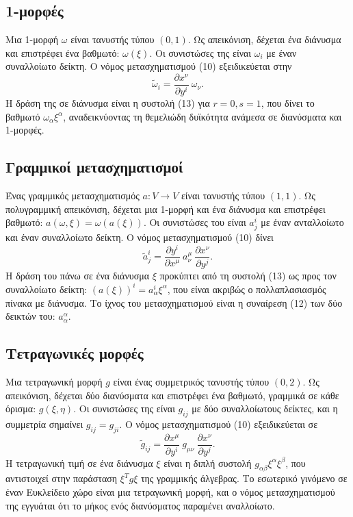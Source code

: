 \documentclass[12pt]{article}
\begin{document}
\subsection{1-μορφές}
Μια 1-μορφή \( \omega \) είναι τανυστής τύπου \( (0,1) \). Ως απεικόνιση, δέχεται ένα διάνυσμα και επιστρέφει ένα βαθμωτό: \( \omega(\xi) \). Οι συνιστώσες της είναι \( \omega_i \) με έναν συναλλοίωτο δείκτη. Ο νόμος μετασχηματισμού (10) εξειδικεύεται στην
\[
\tilde{\omega}_i = \frac{\partial x^\nu}{\partial y^i} \ \omega_\nu. \tag{15}
\]
Η δράση της σε διάνυσμα είναι η συστολή (13) για \( r=0, s=1 \), που δίνει το βαθμωτό \( \omega_\alpha \xi^\alpha \), αναδεικνύοντας τη θεμελιώδη δυϊκότητα ανάμεσα σε διανύσματα και 1-μορφές.

\subsection{Γραμμικοί μετασχηματισμοί}
Ένας γραμμικός μετασχηματισμός \( a: V \to V \) είναι τανυστής τύπου \( (1,1) \). Ως πολυγραμμική απεικόνιση, δέχεται μια 1-μορφή και ένα διάνυσμα και επιστρέφει βαθμωτό: \( a(\omega, \xi) = \omega(a(\xi)) \). Οι συνιστώσες του είναι \( a^i_j \) με έναν ανταλλοίωτο και έναν συναλλοίωτο δείκτη. Ο νόμος μετασχηματισμού (10) δίνει
\[
\tilde{a}^i_j = \frac{\partial y^i}{\partial x^\mu} \ a^\mu_\nu \ \frac{\partial x^\nu}{\partial y^j}. \tag{16}
\]
Η δράση του πάνω σε ένα διάνυσμα \( \xi \) προκύπτει από τη συστολή (13) ως προς τον συναλλοίωτο δείκτη: \( (a(\xi))^i = a^i_\alpha \xi^\alpha \), που είναι ακριβώς ο πολλαπλασιασμός πίνακα με διάνυσμα. Το ίχνος του μετασχηματισμού είναι η συναίρεση (12) των δύο δεικτών του: \( a^\alpha_\alpha \).

\subsection{Τετραγωνικές μορφές}
Μια τετραγωνική μορφή \( g \) είναι ένας συμμετρικός τανυστής τύπου \( (0,2) \). Ως απεικόνιση, δέχεται δύο διανύσματα και επιστρέφει ένα βαθμωτό, γραμμικά σε κάθε όρισμα: \( g(\xi, \eta) \). Οι συνιστώσες της είναι \( g_{ij} \) με δύο συναλλοίωτους δείκτες, και η συμμετρία σημαίνει \( g_{ij} = g_{ji} \). Ο νόμος μετασχηματισμού (10) εξειδικεύεται σε
\[
\tilde{g}_{ij} = \frac{\partial x^\mu}{\partial y^i} \ g_{\mu\nu} \ \frac{\partial x^\nu}{\partial y^j}. \tag{17}
\]
Η τετραγωνική τιμή σε ένα διάνυσμα \( \xi \) είναι η διπλή συστολή \( g_{\alpha\beta} \xi^\alpha \xi^\beta \), που αντιστοιχεί στην παράσταση \( \xi^T g \xi \) της γραμμικής άλγεβρας. Το εσωτερικό γινόμενο σε έναν Ευκλείδειο χώρο είναι μια τετραγωνική μορφή, και ο νόμος μετασχηματισμού της εγγυάται ότι το μήκος ενός διανύσματος παραμένει αναλλοίωτο.
\end{document}
